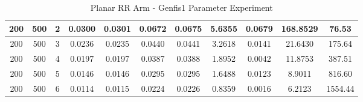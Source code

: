 \documentclass[11.5pt, twoside, a4paper]{article}
\begin{document}
\begin{table}
{\begin{tabular}{|c | c | c | c | c | c | c | c | c | c  | c | }
200 &	500 &	2 &	0.0300 &	0.0301 &	0.0672 &	0.0675 &	5.6355 &	0.0679 &	168.8529 &		76.53 \\ \hline
200 &	500 &	3 &	0.0236 &	0.0235 &	0.0440 &	0.0441 &	3.2618 &	0.0141 &	21.6430 &		175.64 \\ \hline
200 &	500 &	4 &	0.0197 &	0.0197 &	0.0387 &	0.0388 &	1.8952 &	0.0042 &	11.8753 &		387.51 \\ \hline
200 &	500 &	5 &	0.0146 &	0.0146 &	0.0295 &	0.0295 &	1.6488 &	0.0123 &	8.9011 &		816.60 \\ \hline
200 &	500 &	6 &	0.0114 &	0.0115 &	0.0224 &	0.0226 &	0.8359 &	0.0016 &	6.2123 &		1554.44 \\ \hline
\end{tabular}}
\caption{Planar RR Arm - Genfis1 Parameter Experiment \label{tab:2LinkGenfis1}}
\end{table}




{}
\end{document}
